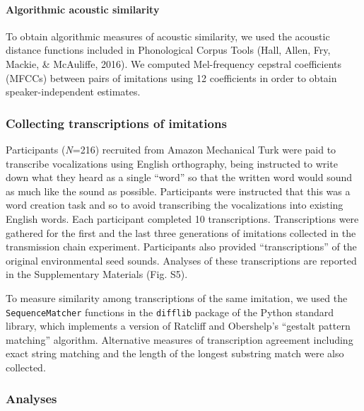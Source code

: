 \documentclass[english,floatsintext,man]{apa6}
\theoremstyle{definition}
\theoremstyle{definition}
\theoremstyle{definition}
\theoremstyle{remark}
\begin{document}
\hypertarget{algorithmic-acoustic-similarity}{%
\paragraph{Algorithmic acoustic
similarity}\label{algorithmic-acoustic-similarity}}

To obtain algorithmic measures of acoustic similarity, we used the
acoustic distance functions included in Phonological Corpus Tools (Hall,
Allen, Fry, Mackie, \& McAuliffe, 2016). We computed Mel-frequency
cepstral coefficients (MFCCs) between pairs of imitations using 12
coefficients in order to obtain speaker-independent estimates.

\hypertarget{collecting-transcriptions-of-imitations}{%
\subsubsection{Collecting transcriptions of
imitations}\label{collecting-transcriptions-of-imitations}}

Participants (\emph{N}=216) recruited from Amazon Mechanical Turk were
paid to transcribe vocalizations using English orthography, being
instructed to write down what they heard as a single \enquote{word} so
that the written word would sound as much like the sound as possible.
Participants were instructed that this was a word creation task and so
to avoid transcribing the vocalizations into existing English words.
Each participant completed 10 transcriptions. Transcriptions were
gathered for the first and the last three generations of imitations
collected in the transmission chain experiment. Participants also
provided \enquote{transcriptions} of the original environmental seed
sounds. Analyses of these transcriptions are reported in the
Supplementary Materials (Fig. S5).

To measure similarity among transcriptions of the same imitation, we
used the \texttt{SequenceMatcher} functions in the \texttt{difflib}
package of the Python standard library, which implements a version of
Ratcliff and Obershelp's \enquote{gestalt pattern matching} algorithm.
Alternative measures of transcription agreement including exact string
matching and the length of the longest substring match were also
collected.

\hypertarget{analyses}{%
\subsubsection{Analyses}\label{analyses}}
\end{document}

